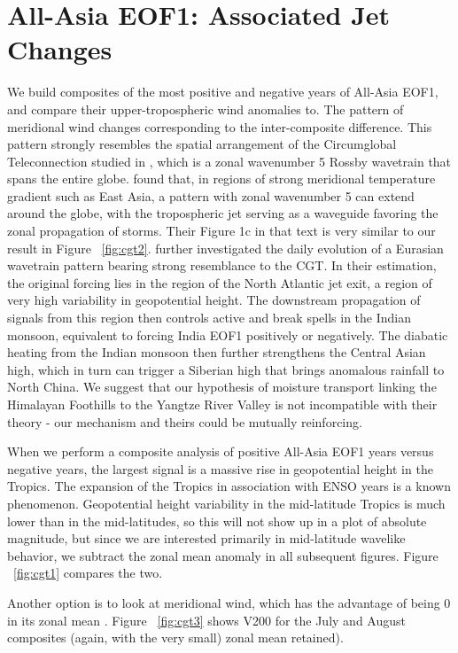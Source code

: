 \section{All-Asia EOF1: Associated Jet Changes}

	We build composites of the most positive and negative years of All-Asia EOF1, and compare their upper-tropospheric wind anomalies to. The pattern of meridional wind changes corresponding to the inter-composite difference. This pattern strongly resembles the spatial arrangement of the Circumglobal Teleconnection studied in \citet{Ding2005a}, which is a zonal wavenumber 5 Rossby wavetrain that spans the entire globe. \citet{Branstator2002} found that, in regions of strong meridional temperature gradient such as East Asia, a pattern with zonal wavenumber 5 can extend around the globe, with the tropospheric jet serving as a waveguide favoring the zonal propagation of storms. Their Figure 1c in that text is very similar to our result in Figure ~\ref{fig:cgt2}. \citet{Ding2007} further investigated the daily evolution of a Eurasian wavetrain pattern bearing strong resemblance to the CGT. In their estimation, the original forcing lies in the region of the North Atlantic jet exit, a region of very high variability in geopotential height. The downstream propagation of signals from this region then controls active and break spells in the Indian monsoon, equivalent to forcing India EOF1 positively or negatively. The diabatic heating from the Indian monsoon then further strengthens the Central Asian high, which in turn can trigger a Siberian high that brings anomalous rainfall to North China. We suggest that our hypothesis of moisture transport linking the Himalayan Foothills to the Yangtze River Valley \citep{Day2015} is not incompatible with their theory - our mechanism and theirs could be mutually reinforcing.
	
	When we perform a composite analysis of positive All-Asia EOF1 years versus negative years, the largest signal is a massive rise in geopotential height in the Tropics. The expansion of the Tropics in association with ENSO years is a known phenomenon.  Geopotential height variability in the mid-latitude Tropics is much lower than in the mid-latitudes, so this will not show up in a plot of absolute magnitude, but since we are interested primarily in mid-latitude wavelike behavior, we subtract the zonal mean anomaly in all subsequent figures. Figure ~\ref{fig:cgt1} compares the two. 
	
	Another option is to look at meridional wind, which has the advantage of being 0 in its zonal mean \citep{Ding2007}. Figure ~\ref{fig:cgt3} shows V200 for the July and August composites (again, with the very small) zonal mean retained).
	
